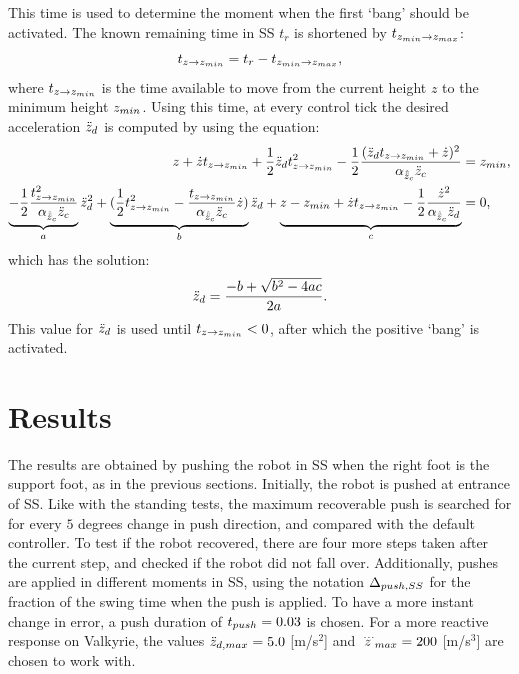 This time is used to determine the moment when the first `bang' should be activated. The known remaining time in \ac{SS} $t_{r}$ is shortened by $ t_{z_{min} \rightarrow z_{max}}$:
\begin{equation}
	t_{z \rightarrow z_{min}} =t_{r} - t_{z_{min} \rightarrow z_{max}},
\end{equation}
where $t_{z \rightarrow z_{min}} $ is the time available to move from the current height $z$ to the minimum height $z_{min}$. Using this time, at every control tick the desired acceleration $\ddot{z}_d$ is computed by using the equation:
\begin{align}
	z + \dot{z}t_{z \rightarrow z_{min}} + \frac{1}{2}\ddot{z}_d t_{z \rightarrow z_{min}}^2 - \frac{1}{2}\frac{(\ddot{z}_d t_{z \rightarrow z_{min}} + \dot{z})^2}{\alpha_{\hat{\ddot{z}}_{c}} \ddot{z}_{c}} &= z_{min}, \\
	\underbrace{-\frac{1}{2}\frac{t_{z \rightarrow z_{min}}^2}{\alpha_{\hat{\ddot{z}}_{c}} \ddot{z}_{c}}}_a \ddot{z}_d^2 + \underbrace{(\frac{1}{2}t_{z \rightarrow z_{min}}^2-\frac{t_{z \rightarrow z_{min}}}{\alpha_{\hat{\ddot{z}}_{c}} \ddot{z}_{c}} \dot{z})}_b \ddot{z}_d + \underbrace{z -z_{min} +\dot{z}t_{z \rightarrow z_{min}} -\frac{1}{2}\frac{\dot{z}^2}{\alpha_{\hat{\ddot{z}}_{c}} \ddot{z}_d}}_c&=0,
\end{align}
which has the solution:
\begin{equation}
 	\ddot{z}_d = \frac{-b + \sqrt{b^2-4ac}}{2a}.
\end{equation}
This value for $\ddot{z}_d$ is used until $t_{z \rightarrow z_{min}}<0$, after which the positive `bang' is activated. 

\section{Results}
The results are obtained by pushing the robot in \ac{SS} when the right foot is the support foot, as in the previous sections. Initially, the robot is pushed at entrance of \ac{SS}. Like with the standing tests, the maximum recoverable push is searched for for every $5$ degrees change in push direction, and compared with the default controller. To test if the robot recovered, there are four more steps taken after the current step, and checked if the robot did not fall over. Additionally, pushes are applied in different moments in \ac{SS}, using the notation $\Delta_{push,SS}$ for the fraction of the swing time when the push is applied. To have a more instant change in error, a push duration of $t_{push}=0.03$ is chosen. For a more reactive response on Valkyrie, the values $\ddot{z}_{d,max}=5.0$ [m/s$^2$] and $\dddot{z}_{max}=200$ [m/s$^3$] are chosen to work with.


